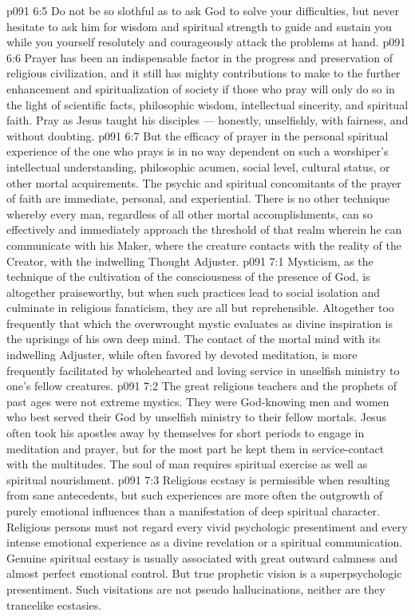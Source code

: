 \vs p091 6:5 \pc Do not be so slothful as to ask God to solve your difficulties, but never hesitate to ask him for wisdom and spiritual strength to guide and sustain you while you yourself resolutely and courageously attack the problems at hand.
\vs p091 6:6 \pc Prayer has been an indispensable factor in the progress and preservation of religious civilization, and it still has mighty contributions to make to the further enhancement and spiritualization of society if those who pray will only do so in the light of scientific facts, philosophic wisdom, intellectual sincerity, and spiritual faith. Pray as Jesus taught his disciples --- honestly, unselfishly, with fairness, and without doubting.
\vs p091 6:7 But the efficacy of prayer in the personal spiritual experience of the one who prays is in no way dependent on such a worshiper’s intellectual understanding, philosophic acumen, social level, cultural status, or other mortal acquirements. The psychic and spiritual concomitants of the prayer of faith are immediate, personal, and experiential. There is no other technique whereby every man, regardless of all other mortal accomplishments, can so effectively and immediately approach the threshold of that realm wherein he can communicate with his Maker, where the creature contacts with the reality of the Creator, with the indwelling Thought Adjuster.
\vs p091 7:1 Mysticism, as the technique of the cultivation of the consciousness of the presence of God, is altogether praiseworthy, but when such practices lead to social isolation and culminate in religious fanaticism, they are all but reprehensible. Altogether too frequently that which the overwrought mystic evaluates as divine inspiration is the uprisings of his own deep mind. The contact of the mortal mind with its indwelling Adjuster, while often favored by devoted meditation, is more frequently facilitated by wholehearted and loving service in unselfish ministry to one’s fellow creatures.
\vs p091 7:2 The great religious teachers and the prophets of past ages were not extreme mystics. They were God\hyp{}knowing men and women who best served their God by unselfish ministry to their fellow mortals. Jesus often took his apostles away by themselves for short periods to engage in meditation and prayer, but for the most part he kept them in service\hyp{}contact with the multitudes. The soul of man requires spiritual exercise as well as spiritual nourishment.
\vs p091 7:3 Religious ecstasy is permissible when resulting from sane antecedents, but such experiences are more often the outgrowth of purely emotional influences than a manifestation of deep spiritual character. Religious persons must not regard every vivid psychologic presentiment and every intense emotional experience as a divine revelation or a spiritual communication. Genuine spiritual ecstasy is usually associated with great outward calmness and almost perfect emotional control. But true prophetic vision is a superpsychologic presentiment. Such visitations are not pseudo hallucinations, neither are they trancelike ecstasies.
